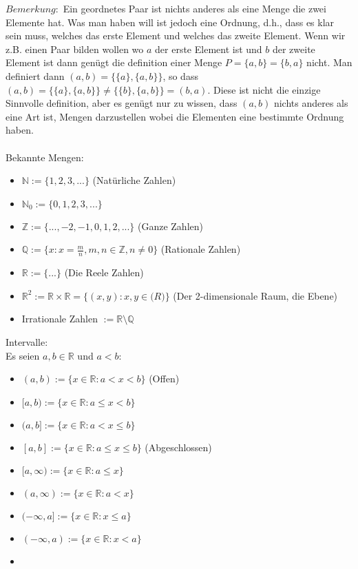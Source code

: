 \documentclass[11pt]{article} %
\begin{document}
$Bemerkung:$ Ein geordnetes Paar ist nichts anderes als eine Menge die zwei Elemente hat. Was man haben will ist jedoch eine Ordnung, d.h., dass es klar sein muss, welches das erste Element und welches das zweite Element. Wenn wir z.B. einen Paar bilden wollen wo $a$ der erste Element ist und $b$ der zweite Element ist dann genügt die definition einer Menge $P = \{a,b\} = \{b,a\}$ nicht. Man definiert dann $(a,b) = \{\{a\},\{a,b\}\}$, so dass  $(a,b) = \{\{a\},\{a,b\}\} \neq \{\{b\},\{a,b\}\} = (b,a)$. Diese ist nicht die einzige Sinnvolle definition, aber es genügt nur zu wissen, dass $(a,b)$ nichts anderes als eine Art ist, Mengen darzustellen wobei die Elementen eine bestimmte Ordnung haben.\\\\ 

Bekannte Mengen:
\begin{itemize} 
\item $\mathbb{N} := \{1,2,3,...\}$ (Natürliche Zahlen)
\item $\mathbb{N}_0:= \{0,1,2,3,...\}$ 
\item $\mathbb{Z} := \{...,-2,-1,0,1,2,...\}$ (Ganze Zahlen)
\item $\mathbb{Q} := \{x: x = \frac{m}{n}, m,n \in \mathbb{Z}, n \neq 0\} $ (Rationale Zahlen) 
\item $\mathbb{R} := \{...\}$ (Die Reele Zahlen)  
\item $\mathbb{R}^2 := \mathbb{R} \times \mathbb{R}=\{(x,y) : x,y \in \mathbb(R)\} $ (Der 2-dimensionale Raum, die Ebene)
\item Irrationale Zahlen $:= \mathbb{R}\setminus \mathbb{Q}$
\end{itemize}

Intervalle:\\
Es seien $a,b \in \mathbb{R}$ und $a < b$:
\begin{itemize}
\item $(a,b):= \{x \in \mathbb{R}: a<x<b\}$ (Offen)
\item $[a,b):= \{x \in \mathbb{R}: a\leq x<b\}$
\item $(a,b]:= \{x \in \mathbb{R}: a<x \leq b\}$
\item $[a,b]:= \{x \in \mathbb{R}: a\leq x \leq b\}$ (Abgeschlossen)
\item $[a,\infty):= \{x \in \mathbb{R}: a\leq x\}$
\item $(a,\infty):= \{x \in \mathbb{R}: a < x\}$
\item $(-\infty,a]:= \{x \in \mathbb{R}: x \leq a\}$
\item $(-\infty,a):= \{x \in \mathbb{R}: x < a\}$
\item
\end{itemize}
\end{document}
